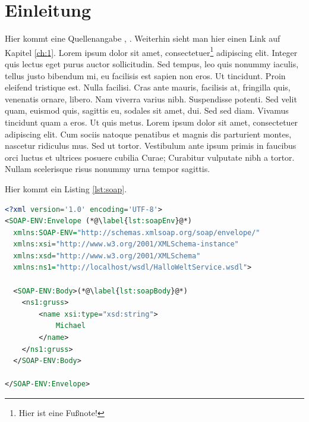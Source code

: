 \chapter{Einleitung}

Hier kommt eine Quellenangabe \cite{Gray1981}, \cite{docker:daemon}. Weiterhin sieht man hier einen Link auf Kapitel \ref{ch:1}.
Lorem ipsum dolor sit amet, consectetuer\footnote{Hier ist eine Fußnote!} adipiscing elit. Integer quis lectus eget purus auctor sollicitudin.
Sed tempus, leo quis nonummy iaculis, tellus justo bibendum mi, eu facilisis est sapien non eros. Ut tincidunt. Proin eleifend tristique est.
Nulla facilisi. Cras ante mauris, facilisis at, fringilla quis, venenatis ornare, libero. Nam viverra varius nibh. Suspendisse potenti.
Sed velit quam, euismod quis, sagittis eu, sodales sit amet, dui. Sed sed diam. Vivamus tincidunt quam a eros. Ut quis metus.
Lorem ipsum dolor sit amet, consectetuer adipiscing elit. Cum sociis natoque penatibus et magnis dis parturient montes, nascetur ridiculus mus.
Sed ut tortor. Vestibulum ante ipsum primis in faucibus orci luctus et ultrices posuere cubilia Curae; Curabitur vulputate nibh a tortor.
Nullam scelerisque risus nonummy urna tempor sagittis.

\noindent Hier kommt ein Listing \ref{lst:soap}.

\begin{center}
\begin{lstlisting}[caption={SOAP Anfrage an einen HalloWelt-Web-Service},label=lst:soap,language=XML,label={lst:soap}]
<?xml version='1.0' encoding='UTF-8'>
<SOAP-ENV:Envelope (*@\label{lst:soapEnv}@*)
  xmlns:SOAP-ENV="http://schemas.xmlsoap.org/soap/envelope/"
  xmlns:xsi="http://www.w3.org/2001/XMLSchema-instance"
  xmlns:xsd="http://www.w3.org/2001/XMLSchema"
  xmlns:ns1="http://localhost/wsdl/HalloWeltService.wsdl">

  <SOAP-ENV:Body>(*@\label{lst:soapBody}@*)
  	<ns1:gruss>
  		<name xsi:type="xsd:string">
  			Michael
  		</name>
  	</ns1:gruss>
  </SOAP-ENV:Body>

</SOAP-ENV:Envelope>
\end{lstlisting}
\end{center}

